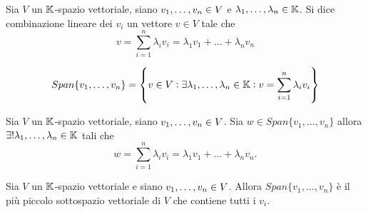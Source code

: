 

%

\begin{definition}
	Sia $ V $ un $ \mathbb{K} $-spazio vettoriale, siano $ v_1, \ldots , v_n \in \nobreak V $ e $ \lambda_1, \ldots , \lambda_n \in \mathbb{K} $. 
	Si dice combinazione lineare dei $ v_i $ un vettore $ v \in V $ tale che 
	\[v = \sum_{i=1}^{n} \lambda_i v_i = \lambda_1 v_1 + \ldots + \lambda_n v_n \]
\end{definition}


\begin{definition}[Span]
	\[Span\{v_1, \ldots , v_n\} = \left\{ v \in V: \exists \lambda_1, \ldots , \lambda_n \in \mathbb{K}: v = \sum_{i=1}^{n} \lambda_i v_i \right\}\]
\end{definition}

\begin{prop}
	Sia $ V $ un $ \mathbb{K} $-spazio vettoriale, siano $ v_1, \ldots , v_n \in \nobreak V $. Sia 
	$ w \in Span\{v_1, \ldots , v_n\}$ allora $\exists !  \lambda_1, \ldots , \lambda_n \in \mathbb{K}$ tali che
	\[w = \sum_{i=1}^{n} \lambda_i v_i = \lambda_1 v_1 + \ldots + \lambda_n v_n. \]  
\end{prop}

\begin{thm}
	Sia $ V $ un $ \mathbb{K} $-spazio vettoriale e siano $ v_1, \ldots , v_n \in \nolinebreak V $. 
	Allora $ Span\{v_1, \ldots , v_n\} $ è il più piccolo sottospazio vettoriale di $ V $ 
	che contiene tutti i $ v_i $.
\end{thm}

